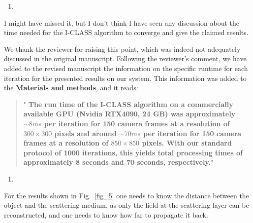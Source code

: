 \documentclass[12pt]{article}
\newenvironment{solved_reviewercomment}
    {\begin{tcolorbox}[width=\linewidth,colback=gray!5,colframe=solved_commentcolor!50,title=Reviewer Comment,left=5pt,right=5pt]}
    {\end{tcolorbox}}
\newenvironment{finished_ourresponse}
    {\begin{tcolorbox}[width=\linewidth,breakable,enhanced,colback=gray!5,colframe=finished_responsecolor!50,title=Response,left=5pt,right=5pt]}
    {\end{tcolorbox}}
\begin{document}
\begin{enumerate}[label=\arabic*., resume]
\item \leavevmode
\end{enumerate}
\vspace{-1em}
\begin{solved_reviewercomment}
I might have missed it, but I don't think I have seen any discussion about the time needed for the I-CLASS algorithm to converge and give the claimed results.
\end{solved_reviewercomment}
\begin{finished_ourresponse}
We thank the reviewer for raising this point, which was indeed not adequately discussed in the original manuscript. Following the reviewer's comment, we have added to the revised manuscript the information on the specific runtime for each iteration for the presented results on our system. This information was added to the \textbf{Materials and methods}, and it reads:

\begin{quote}
    "{\bfseries
    The run time of the I-CLASS algorithm on a commercially available GPU (Nvidia RTX4090, 24 GB) was approximately $\sim 8ms$ per iteration for 150 camera frames at a resolution of $300 \times 300$ pixels and around $\sim 70ms$ per iteration for 150 camera frames at a resolution of $850 \times 850$ pixels. With our standard protocol of 1000 iterations, this yields total processing times of approximately 8 seconds and 70 seconds, respectively.}"
\end{quote}
\end{finished_ourresponse}



        
\begin{enumerate}[label=\arabic*., resume]
\item \leavevmode
\end{enumerate}
\vspace{-1em}
\begin{solved_reviewercomment}
    For the results shown in Fig.~\ref{fig_5} one needs to know the distance between the object and the scattering medium, as only the field at the scattering layer can be reconstructed, and one needs to know how far to propagate it back.
\end{solved_reviewercomment}
\end{document}

